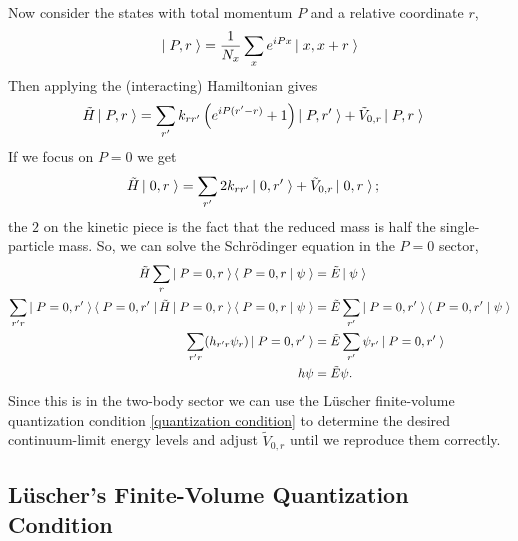 Now consider the states with total momentum $P$ and a relative coordinate $r$,
\begin{align}
    \left|\;P,r\;\right\rangle = \frac{1}{N_x} \sum_x e^{iPx} \left|\;x,x+r\;\right\rangle
\end{align}
Then applying the (interacting) Hamiltonian gives
\begin{align}
    \tilde{H} \left|\;P,r\;\right\rangle
    &=
            \sum_{r'} k_{rr'} \left( e^{iP(r'-r)}+1\right)\left|\;P,r'\;\right\rangle
        +   \tilde{V}_{0,r} \left|\;P,r\;\right\rangle
\end{align}
If we focus on $P=0$ we get
\begin{align}
    \tilde{H} \left|\;0,r\;\right\rangle
    &=
            \sum_{r'} 2k_{rr'} \left|\;0,r'\;\right\rangle
        +   \tilde{V}_{0,r} \left|\;0,r\;\right\rangle;
\end{align}
the $2$ on the kinetic piece is the fact that the reduced mass is half the single-particle mass.
So, we can solve the Schr\"{o}dinger equation in the $P=0$ sector,
\begin{align}
    \tilde{H} \sum_r \left|\;P=0,r\;\right\rangle\left\langle\;P=0,r\;\middle|\;\psi\;\right\rangle &= \tilde{E}\left|\;\psi\;\right\rangle
    \\
    \sum_{r'r} \left|\;P=0, r'\;\right\rangle \left\langle\;P=0, r'\;\right| \tilde{H} \left|\;P=0,r\;\right\rangle\left\langle\;P=0,r\;\middle|\;\psi\;\right\rangle &= \tilde{E} \sum_{r'} \left|\;P=0, r'\;\right\rangle\left\langle\;P=0,r'\;\middle|\;\psi\;\right\rangle
    \\
    \sum_{r'r} (h_{r'r} \psi_r) \left|\;P=0, r'\;\right\rangle &= \tilde{E} \sum_{r'} \psi_{r'} \left|\;P=0, r'\;\right\rangle
    \\
    h \psi &= \tilde{E} \psi.
    \label{eq:two-body schrodinger equation}
\end{align}
Since this is in the two-body sector we can use the L\"{u}scher finite-volume quantization condition \eqref{quantization condition} to determine the desired continuum-limit energy levels and adjust $\tilde{V}_{0,r}$ until we reproduce them correctly.

\subsection{L\"{u}scher's Finite-Volume Quantization Condition}

